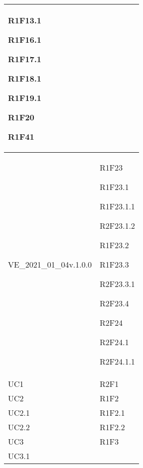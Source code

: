 \begin{center}
\begin{longtable}{|p{44mm}|p{22mm}|}
R1F13.1 \newline

R1F16.1 \newline

R1F17.1 \newline

R1F18.1 \newline

R1F19.1 \newline

R1F20 \newline

R1F41 \newline
\\
\hline
VE\_2021\_01\_04v.1.0.0 &

R1F23 \newline

R1F23.1 \newline

R1F23.1.1 \newline

R2F23.1.2 \newline

R1F23.2 \newline

R1F23.3 \newline

R2F23.3.1 \newline

R2F23.4 \newline

R2F24 \newline

R2F24.1 \newline

R2F24.1.1 \newline
\\
\hline
UC1 &

 R2F1 \newline
\\
\hline
UC2 &

R1F2 \newline
\\
\hline
UC2.1 &

R1F2.1 \newline
\\
\hline
UC2.2 &

R1F2.2 \newline
\\
\hline
UC3 &

R1F3 \newline
\\
\hline
UC3.1 &


\end{longtable}
\end{center}
